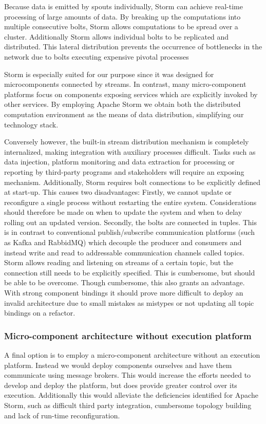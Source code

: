 Because data is emitted by spouts individually, Storm can achieve real-time processing of large amounts of data. By breaking up the computations into multiple consecutive bolts, Storm allows computations to be spread over a cluster. Additionally Storm allows individual bolts to be replicated and distributed. This lateral distribution prevents the occurrence of bottlenecks in the network due to bolts executing expensive pivotal processes

Storm is especially suited for our purpose since it was designed for microcomponents connected by streams. In contrast, many micro-component platforms focus on components exposing services which are explicitly invoked by other services\cite{refs: spring, etc}. By employing Apache Storm we obtain both the distributed computation environment as the means of data distribution, simplifying our technology stack.

Conversely however, the built-in stream distribution mechanism is completely internalized, making integration with auxiliary processes difficult. Tasks such as data injection, platform monitoring and data extraction for processing or reporting by third-party programs and stakeholders will require an exposing mechanism. Additionally, Storm requires bolt connections to be explicitly defined at start-up. This causes two disadvantages: Firstly, we cannot update or reconfigure a single process without restarting the entire system. Considerations should therefore be made on when to update the system and when to delay rolling out an updated version. Secondly, the bolts are connected in tuples. This is in contrast to conventional publish/subscribe communication platforms (such as Kafka and RabbidMQ) which decouple the producer and consumers and instead write and read to addressable communication channels called topics. Storm allows reading and listening on streams of a certain topic, but the connection still needs to be explicitly specified. This is cumbersome, but should be able to be overcome. Though cumbersome, this also grants an advantage. With strong component bindings it should prove more difficult to deploy an invalid architecture due to small mistakes as mistypes or not updating all topic bindings on a refactor. 

\subsubsection*{Micro-component architecture without execution platform}
A final option is to employ a micro-component architecture without an execution platform. Instead we would deploy components ourselves and have them communicate using message brokers. This would increase the efforts needed to develop and deploy the platform, but does provide greater control over its execution. Additionally this would alleviate the deficiencies identified for Apache Storm, such as difficult third party integration, cumbersome topology building and lack of run-time reconfiguration. 

